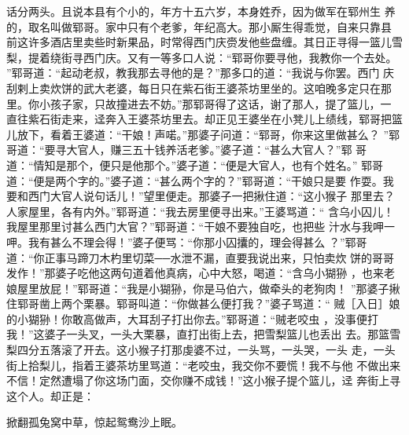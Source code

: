 话分两头。且说本县有个小的，年方十五六岁，本身姓乔，因为做军在郓州生
养的，取名叫做郓哥。家中只有个老爹，年纪高大。那小厮生得乖觉，自来只靠县
前这许多酒店里卖些时新果品，时常得西门庆赍发他些盘缠。其日正寻得一篮儿雪
梨，提着绕街寻西门庆。又有一等多口人说：“郓哥你要寻他，我教你一个去处。
”郓哥道：“起动老叔，教我那去寻他的是？”那多口的道：“我说与你罢。西门
庆刮剌上卖炊饼的武大老婆，每日只在紫石街王婆茶坊里坐的。这咱晚多定只在那
里。你小孩子家，只故撞进去不妨。”那郓哥得了这话，谢了那人，提了篮儿，一
直往紫石街走来，迳奔入王婆茶坊里去。却正见王婆坐在小凳儿上绩线，郓哥把篮
儿放下，看着王婆道：“干娘！声喏。”那婆子问道：“郓哥，你来这里做甚么？
”郓哥道：“要寻大官人，赚三五十钱养活老爹。”婆子道：“甚么大官人？”郓
哥道：“情知是那个，便只是他那个。”婆子道：“便是大官人，也有个姓名。”
郓哥道：“便是两个字的。”婆子道：“甚么两个字的？”郓哥道：“干娘只是要
作耍。我要和西门大官人说句话儿！”望里便走。那婆子一把揪住道：“这小猴子
那里去？人家屋里，各有内外。”郓哥道：“我去房里便寻出来。”王婆骂道：“
含乌小囚儿！我屋里那里讨甚么西门大官？”郓哥道：“干娘不要独自吃，也把些
汁水与我呷一呷。我有甚么不理会得！”婆子便骂：“你那小囚攮的，理会得甚么
？”郓哥道：“你正事马蹄刀木杓里切菜──水泄不漏，直要我说出来，只怕卖炊
饼的哥哥发作！”那婆子吃他这两句道着他真病，心中大怒，喝道：“含乌小猢狲
，也来老娘屋里放屁！”郓哥道：“我是小猢狲，你是马伯六，做牵头的老狗肉！
”那婆子揪住郓哥凿上两个栗暴。郓哥叫道：“你做甚么便打我？”婆子骂道：“
贼［入日］娘的小猢狲！你敢高做声，大耳刮子打出你去。”郓哥道：“贼老咬虫
，没事便打我！”这婆子一头叉，一头大栗暴，直打出街上去，把雪梨篮儿也丢出
去。那篮雪梨四分五落滚了开去。这小猴子打那虔婆不过，一头骂，一头哭，一头
走，一头街上拾梨儿，指着王婆茶坊里骂道：“老咬虫，我交你不要慌！我不与他
不做出来不信！定然遭塌了你这场门面，交你赚不成钱！”这小猴子提个篮儿，迳
奔街上寻这个人。却正是：

掀翻孤兔窝中草，惊起鸳鸯沙上眠。